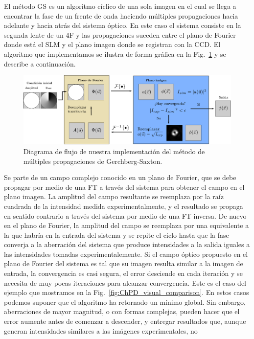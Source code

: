 El método GS es un algoritmo cíclico de una sola imagen en el cual se
llega a encontrar la fase de un frente de onda haciendo múltiples
propagaciones hacia adelante y hacia atrás del sistema óptico. En este
caso el sistema consiste en la segunda lente de un 4F y las
propagaciones suceden entre el plano de Fourier donde está el SLM y el
plano imagen donde se registran con la CCD. El
algoritmo que implementamos se ilustra de forma gráfica en la
Fig.~\ref{fig:GS_algorithm} y se describe a continuación.
\begin{figure}[h!]
\centering
\includegraphics[scale=.36]{GS_algorithm.pdf}
\caption[Algoritmo de GS]{Diagrama de flujo de nuestra implementación
  del método de múltiples propagaciones de Gerchberg-Saxton.} 
\label{fig:GS_algorithm}
\end{figure}
Se parte de un campo complejo conocido en un plano
de Fourier, que se debe propagar por medio de una FT a través del
sistema para obtener el campo en el plano imagen. La amplitud del
campo resultante se reemplaza por la raíz cuadrada de la intensidad
medida experimentalmente, y el resultado se propaga en sentido
contrario a través del sistema por medio de una FT inversa. De nuevo
en el plano de Fourier, la amplitud del campo se reemplaza por una
equivalente a la que habría en la entrada del sistema y se repite el
ciclo hasta que la fase converja a la aberración del sistema que
produce intensidades a la salida iguales a las intensidades tomadas
experimentalemente.  
Si el campo óptico propuesto en el plano de
Fourier del sistema es tal que su imagen resulta similar a la imagen
de entrada, la convergencia es casi segura, el error desciende en cada
iteración y se necesita de muy pocas
iteraciones para alcanzar convergencia. Este es el caso del ejemplo
que mostramos en la Fig.~\ref{fig:ChPD_visual_comparison}. En estos
casos podemos suponer que el algoritmo ha retornado un mínimo
global. Sin embargo, aberraciones de mayor magnitud, o con formas
complejas, pueden hacer que el error aumente antes de comenzar a
descender, y entregar resultados que, aunque generan intensidades
similares a las imágenes experimentales, no 
